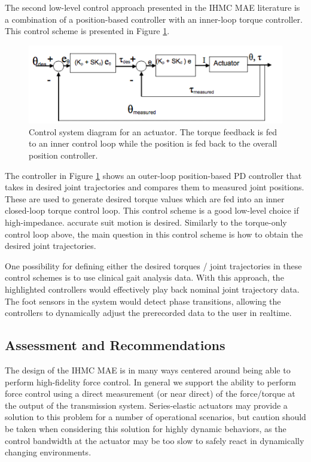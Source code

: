\begin{refsection}
 The second low-level control approach presented in the IHMC MAE literature is a combination of a position-based controller with an inner-loop torque controller.  This control scheme is presented in Figure \ref{fig:IHMCPOS}.
  \begin{figure}[thpb]
\centering
\includegraphics[width=3.in]{exos/figs/ihmc/positionCon}
  \caption{Control system diagram for an actuator. The torque feedback is fed to an inner control loop while the position is fed back to the overall position controller.}
 \label{fig:IHMCPOS}   
 \end{figure}
 The controller in Figure \ref{fig:IHMCPOS} shows an outer-loop position-based PD controller that takes in desired joint trajectories and compares them to measured joint positions.  These are used to generate desired torque values which are fed into an inner closed-loop torque control loop.  This control scheme is a good low-level choice if high-impedance. accurate suit motion is desired.  Similarly to the torque-only control loop above, the main question in this control scheme is how to obtain the desired joint trajectories.  
 
 One possibility for defining either the desired torques / joint trajectories in these control schemes is to use clinical gait analysis data.  With this approach, the highlighted controllers would effectively play back nominal joint trajectory data.  The foot sensors in the system would detect phase transitions, allowing the controllers to dynamically adjust the prerecorded data to the user in realtime.
 
 
 \subsection{Assessment and Recommendations}
 
The design of the IHMC MAE is in many ways centered around being able to perform high-fidelity force control.  In general we support the ability to perform force control using a direct measurement (or near direct) of the force/torque at the output of the transmission system.  Series-elastic actuators may provide a solution to this problem for a number of operational scenarios, but caution should be taken when considering this solution for highly dynamic behaviors, as the control bandwidth at the actuator may be too slow to safely react in dynamically changing environments. 
 

\end{refsection}
